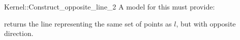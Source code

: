 \begin{ccRefFunctionObjectConcept}{Kernel::Construct_opposite_line_2}
A model for this must provide:


{returns the line representing the same set of points as $l$,
but with opposite direction.}

\ccIsModel{}

\end{ccRefFunctionObjectConcept}
